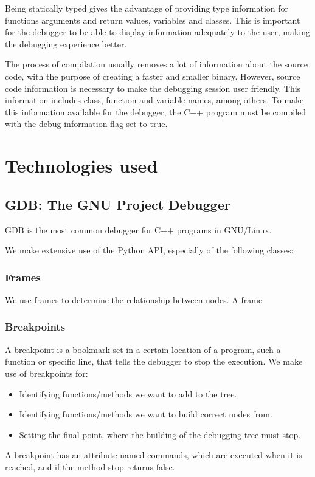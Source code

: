 Being statically typed gives the advantage of providing type information for functions arguments and return values, variables and classes. This is important for the debugger to be able to display information adequately to the user, making the debugging experience better.

The process of compilation usually removes a lot of information about the source code, with the purpose of creating a faster and smaller binary.
However, source code information is necessary to make the debugging session user friendly. This information includes class, function and variable names, among others.
To make this information available for the debugger, the C++ program must be compiled with the debug information flag set to true.

\section{Technologies used}
\subsection{GDB: The GNU Project Debugger}
GDB is the most common debugger for C++ programs in GNU/Linux.

We make extensive use of the Python API, especially of the following classes:
\subsubsection{Frames}
We use frames to determine the relationship between nodes.
A frame 
\subsubsection{Breakpoints}
A breakpoint is a bookmark set in a certain location of a program, such a function or specific line, that tells the debugger to stop the execution.
We make use of breakpoints for:
\begin{itemize}
    \item Identifying functions/methods we want to add to the tree.
    \item Identifying functions/methods we want to build correct nodes from.
    \item Setting the final point, where the building of the debugging tree must stop.
\end{itemize}
A breakpoint has an attribute named commands, which are executed when it is reached, and if the method stop returns false.

